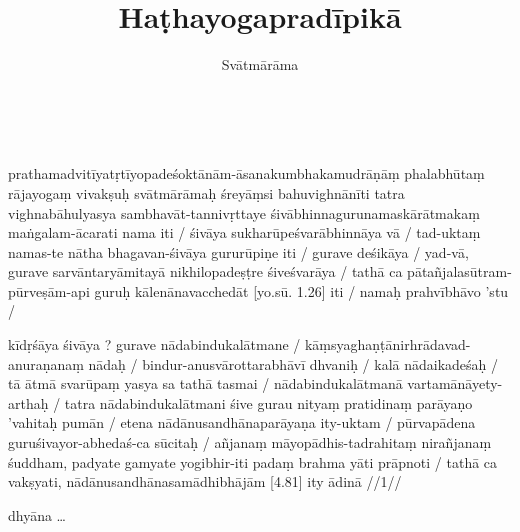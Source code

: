 \documentclass[12pt,parskip]{scrartcl}
\author{Svātmārāma}
\title{Haṭhayogapradīpikā}
\date{}
\begin{document}
\maketitle

\begin{ekdosis}
  \begin{tlg}[4.1][7.1]
    \\
  \end{tlg}

  \begin{cjyo}[4.1]
    prathamadvitīyatṛtīyopadeśoktānām-āsanakumbhakamudrāṇāṃ phalabhūtaṃ rājayogaṃ vivakṣuḥ svātmārāmaḥ śreyāṃsi bahuvighnānīti tatra vighnabāhulyasya sambhavāt-tannivṛttaye śivābhinnagurunamaskārātmakaṃ maṅgalam-ācarati nama iti /
    śivāya sukharūpeśvarābhinnāya vā /
    tad-uktaṃ namas-te nātha bhagavan-śivāya gururūpiṇe iti /
    gurave deśikāya /
    yad-vā, gurave sarvāntaryāmitayā nikhilopadeṣṭre śiveśvarāya /
    tathā ca pātañjalasūtram-pūrveṣām-api guruḥ kālenānavacchedāt [yo.sū. 1.26] iti /
    namaḥ prahvībhāvo 'stu /
    
    kīdṛśāya śivāya ? gurave nādabindukalātmane /
    kāṃsyaghaṇṭānirhrādavad-anuraṇanaṃ nādaḥ /
    bindur-anusvārottarabhāvī dhvaniḥ /
    kalā nādaikadeśaḥ /
    tā ātmā svarūpaṃ yasya sa tathā tasmai /
    nādabindukalātmanā vartamānāyety-arthaḥ /
    tatra nādabindukalātmani śive gurau nityaṃ pratidinaṃ parāyaṇo 'vahitaḥ pumān /
    etena nādānusandhānaparāyaṇa ity-uktam /
    pūrvapādena guruśivayor-abhedaś-ca sūcitaḥ /
    añjanaṃ māyopādhis-tadrahitaṃ nirañjanaṃ śuddham, padyate gamyate yogibhir-iti padaṃ brahma yāti prāpnoti /
    tathā ca vakṣyati, nādānusandhānasamādhibhājām [4.81] ity ādinā //1//
  \end{cjyo}

  \begin{cpra}[7.1]
    dhyāna …
  \end{cpra}

  \begin{tlg}[4.2][7.2]
    \\
  \end{tlg}


\end{ekdosis}
\end{document}

